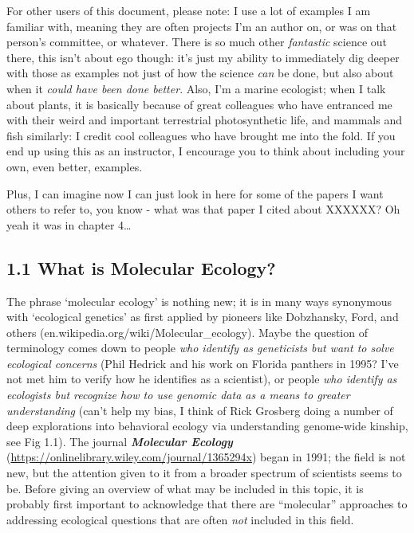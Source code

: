 \documentclass[
]{article}
\begin{document}
For other users of this document, please note: I use a lot of examples I
am familiar with, meaning they are often projects I'm an author on, or
was on that person's committee, or whatever. There is so much other
\emph{fantastic} science out there, this isn't about ego though: it's
just my ability to immediately dig deeper with those as examples not
just of how the science \emph{can} be done, but also about when it
\emph{could have been done better}. Also, I'm a marine ecologist; when I
talk about plants, it is basically because of great colleagues who have
entranced me with their weird and important terrestrial photosynthetic
life, and mammals and fish similarly: I credit cool colleagues who have
brought me into the fold. If you end up using this as an instructor, I
encourage you to think about including your own, even better, examples.

Plus, I can imagine now I can just look in here for some of the papers I
want others to refer to, you know - what was that paper I cited about
XXXXXX? Oh yeah it was in chapter 4\ldots{}

\hypertarget{what-is-molecular-ecology}{%
\subsection{1.1 What is Molecular
Ecology?}\label{what-is-molecular-ecology}}

The phrase `molecular ecology' is nothing new; it is in many ways
synonymous with `ecological genetics' as first applied by pioneers like
Dobzhansky, Ford, and others (en.wikipedia.org/wiki/Molecular\_ecology).
Maybe the question of terminology comes down to people \emph{who
identify as geneticists but want to solve ecological concerns} (Phil
Hedrick and his work on Florida panthers in 1995? I've not met him to
verify how he identifies as a scientist), or people \emph{who identify
as ecologists but recognize how to use genomic data as a means to
greater understanding} (can't help my bias, I think of Rick Grosberg
doing a number of deep explorations into behavioral ecology via
understanding genome-wide kinship, see Fig 1.1). The journal
\textbf{\emph{Molecular Ecology}}
(\url{https://onlinelibrary.wiley.com/journal/1365294x}) began in 1991;
the field is not new, but the attention given to it from a broader
spectrum of scientists seems to be. Before giving an overview of what
may be included in this topic, it is probably first important to
acknowledge that there are ``molecular'' approaches to addressing
ecological questions that are often \emph{not} included in this field.
\end{document}
